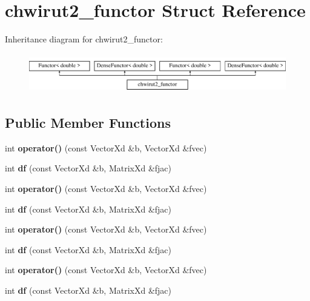 \hypertarget{structchwirut2__functor}{}\section{chwirut2\+\_\+functor Struct Reference}
\label{structchwirut2__functor}
Inheritance diagram for chwirut2\+\_\+functor\+:\begin{figure}[H]
\begin{center}
\leavevmode
\includegraphics[height=1.728395cm]{structchwirut2__functor}
\end{center}
\end{figure}
\subsection*{Public Member Functions}
\begin{DoxyCompactItemize}
\item 
\mbox{\label{structchwirut2__functor_a6d502d5bc76e92756a14b2a379abcff3}} 
int {\bfseries operator()} (const Vector\+Xd \&b, Vector\+Xd \&fvec)
\item 
\mbox{\label{structchwirut2__functor_a7849160cfa45e22704e2fab17c05941c}} 
int {\bfseries df} (const Vector\+Xd \&b, Matrix\+Xd \&fjac)
\item 
\mbox{\label{structchwirut2__functor_a6d502d5bc76e92756a14b2a379abcff3}} 
int {\bfseries operator()} (const Vector\+Xd \&b, Vector\+Xd \&fvec)
\item 
\mbox{\label{structchwirut2__functor_a7849160cfa45e22704e2fab17c05941c}} 
int {\bfseries df} (const Vector\+Xd \&b, Matrix\+Xd \&fjac)
\item 
\mbox{\label{structchwirut2__functor_a6d502d5bc76e92756a14b2a379abcff3}} 
int {\bfseries operator()} (const Vector\+Xd \&b, Vector\+Xd \&fvec)
\item 
\mbox{\label{structchwirut2__functor_a7849160cfa45e22704e2fab17c05941c}} 
int {\bfseries df} (const Vector\+Xd \&b, Matrix\+Xd \&fjac)
\item 
\mbox{\label{structchwirut2__functor_a6d502d5bc76e92756a14b2a379abcff3}} 
int {\bfseries operator()} (const Vector\+Xd \&b, Vector\+Xd \&fvec)
\item 
\mbox{\label{structchwirut2__functor_a7849160cfa45e22704e2fab17c05941c}} 
int {\bfseries df} (const Vector\+Xd \&b, Matrix\+Xd \&fjac)
\end{DoxyCompactItemize}
